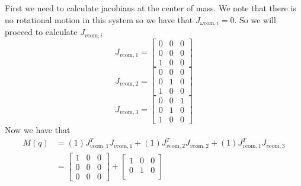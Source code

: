 \documentclass{../homework}
\begin{document}
\begin{parts}[n]
\begin{parts}
\begin{parts}[r]
               \part{}
               First we need to calculate jacobians at the center of mass. We note that there is no rotational motion in this system so we have that $J_{\omega\text{com},i} = 0$. So we will proceed to calculate $J_{v\text{com},i}$
               \[
                   J_{v\text{com},1} = 
                   \begin{bmatrix}
                       0 & 0 & 0 \\
                       0 & 0 & 0 \\
                       1 & 0 & 0 
                   \end{bmatrix}
               \]
               \[
                   J_{v\text{com},2} = 
                   \begin{bmatrix}
                       0 & 0 & 0 \\
                       0 & 1 & 0 \\
                       1 & 0 & 0
                   \end{bmatrix}
               \]
               \[
                   J_{v\text{com},3} = 
                   \begin{bmatrix}
                       0 & 0 & 1 \\
                       0 & 1 & 0 \\
                       1 & 0 & 0
                   \end{bmatrix}
               \]
               Now we have that
               \[
                   \begin{aligned}
                       M(q) &= (1)J_{v\text{com},1}^TJ_{v\text{com},1} + (1)J_{v\text{com},2}^TJ_{v\text{com},2} +(1)J_{v\text{com},1}^TJ_{v\text{com},3} \\
                            &= 
                            \begin{bmatrix}
                                1 & 0 & 0 \\
                                0 & 0 & 0 \\
                                0 & 0 & 0
                            \end{bmatrix}
                            +
                            \begin{bmatrix}
                                1 & 0 & 0 \\
                                0 & 1 & 0 \\

\end{bmatrix}
\end{aligned}\]
\end{parts}
\end{parts}
\end{parts}
\end{document}
